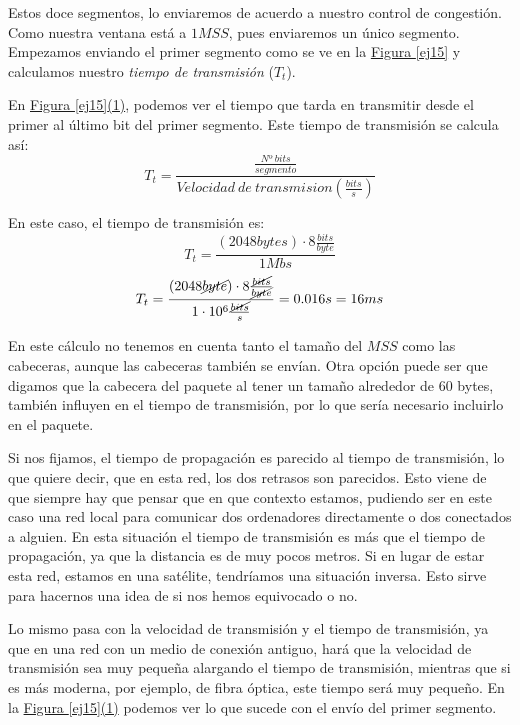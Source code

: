 \documentclass[10pt,a4paper,spanish]{report}
\begin{document}
Estos doce segmentos, lo enviaremos de acuerdo a nuestro control de congestión. Como nuestra ventana está a $1MSS$, pues enviaremos un único segmento. Empezamos enviando el primer segmento como se ve en la \hyperref[ej15]{Figura \ref*{ej15}} y calculamos nuestro \textit{tiempo de transmisión} ($T_t$).

En \hyperref[ej15]{Figura \ref*{ej15}(1)}, podemos ver el tiempo que tarda en transmitir desde el primer al último bit del primer segmento. Este tiempo de transmisión se calcula así:
\begin{displaymath}
    T_t = \frac{\frac{Nº~bits}{segmento}}{Velocidad~de~transmision(\frac{bits}{s})}
\end{displaymath}

En este caso, el tiempo de transmisión es:
\begin{displaymath}
    T_t = \frac{(2048bytes)\cdot8\frac{bits}{byte}}{1Mbs}
\end{displaymath}
\begin{displaymath}
    T_t = \frac{(2048 \cancel{byte})\cdot8\frac{\cancel{bits}}{\cancel{byte}}}{1\cdot10^6\frac{\cancel{bits}}{s}} = 0.016s = 16ms
\end{displaymath}

En este cálculo no tenemos en cuenta tanto el tamaño del $MSS$ como las cabeceras, aunque las cabeceras también se envían. Otra opción puede ser que digamos que la cabecera del paquete al tener un tamaño alrededor de 60 bytes, también influyen en el tiempo de transmisión, por lo que sería necesario incluirlo en el paquete. 

Si nos fijamos, el tiempo de propagación es parecido al tiempo de transmisión, lo que quiere decir, que en esta red, los dos retrasos son parecidos. Esto viene de que siempre hay que pensar que en que contexto estamos, pudiendo ser en este caso una red local para comunicar dos ordenadores directamente o dos conectados a alguien. En esta situación el tiempo de transmisión es más que el tiempo de propagación, ya que la distancia es de muy pocos metros. Si en lugar de estar esta red, estamos en una satélite, tendríamos una situación inversa. Esto sirve para hacernos una idea de si nos hemos equivocado o no.

Lo mismo pasa con la velocidad de transmisión y el tiempo de transmisión, ya que en una red con un medio de conexión antiguo, hará que la velocidad de transmisión sea muy pequeña alargando el tiempo de transmisión, mientras que si es más moderna, por ejemplo, de fibra óptica, este tiempo será muy pequeño. En la \hyperref[ej15]{Figura \ref*{ej15}(1)} podemos ver lo que sucede con el envío del primer segmento. 
\end{document}
